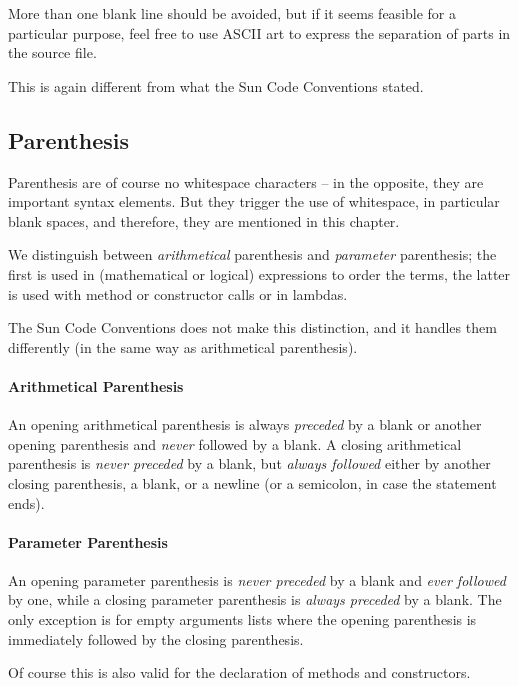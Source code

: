 \documentclass[11pt,a4paper, titlepage, parskip=half, headsepline, footsepline, cleardoublepage=current, headheight=1cm]{scrbook}
\begin{document}
More than one blank line should be avoided, but if it seems feasible for a particular purpose, feel free to use ASCII art to express the separation of parts in the source file.

This is again different from what the Sun Code Conventions\autocite{SUN_CODE_CONVENTIONS:BlankLines} stated.

\subsection{Parenthesis}\label{sec:Parenthesis}
Parenthesis are of course no whitespace characters – in the opposite, they are important syntax elements. But they trigger the use of whitespace, in particular blank spaces, and therefore, they are mentioned in this chapter.

We distinguish between \textit{arithmetical} parenthesis and \textit{parameter} parenthesis; the first is used in (mathematical or logical) expressions to order the terms, the latter is used with method or constructor calls or in lambdas.

The Sun Code Conventions\autocite{SUN_CODE_CONVENTIONS:BlankSpaces} does not make this distinction, and it handles them differently (in the same way as arithmetical parenthesis).

\paragraph{Arithmetical Parenthesis}
An opening arithmetical parenthesis is always \textit{preceded} by a blank or another opening parenthesis and \textit{never} followed by a blank. A closing arithmetical parenthesis is \textit{never preceded} by a blank, but \textit{always followed} either by another closing parenthesis, a blank, or a newline (or a semicolon, in case the statement ends).

\paragraph{Parameter Parenthesis}\label{sec:ParameterParenthesis}
An opening parameter parenthesis is \textit{never preceded} by a blank and \textit{ever followed} by one, while a closing parameter parenthesis is \textit{always preceded} by a blank. The only exception is for empty arguments lists where the opening parenthesis is immediately followed by the closing parenthesis.

Of course this is also valid for the declaration of methods and constructors.
\end{document}
